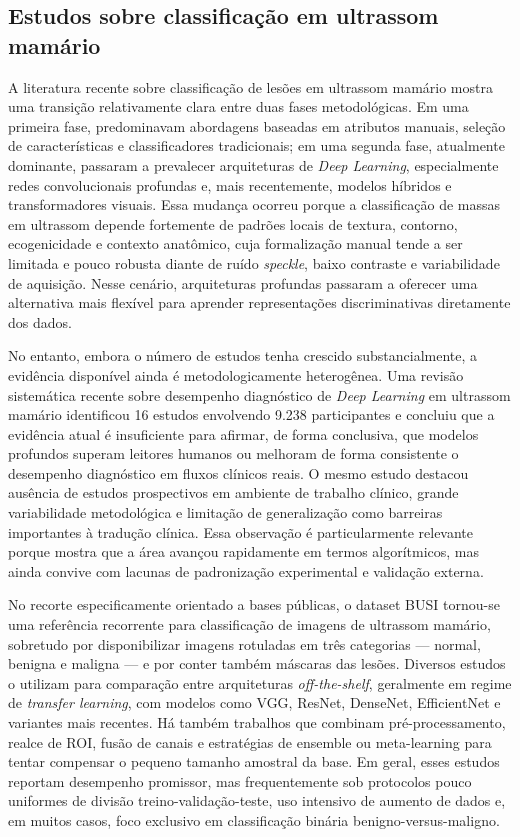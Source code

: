 \documentclass[tcc,capa]{texufpel}
\begin{document}
\subsection{Estudos sobre classificação em ultrassom mamário}

A literatura recente sobre classificação de lesões em ultrassom mamário mostra uma transição relativamente clara entre duas fases metodológicas. Em uma primeira fase, predominavam abordagens baseadas em atributos manuais, seleção de características e classificadores tradicionais; em uma segunda fase, atualmente dominante, passaram a prevalecer arquiteturas de \textit{Deep Learning}, especialmente redes convolucionais profundas e, mais recentemente, modelos híbridos e transformadores visuais. Essa mudança ocorreu porque a classificação de massas em ultrassom depende fortemente de padrões locais de textura, contorno, ecogenicidade e contexto anatômico, cuja formalização manual tende a ser limitada e pouco robusta diante de ruído \textit{speckle}, baixo contraste e variabilidade de aquisição. Nesse cenário, arquiteturas profundas passaram a oferecer uma alternativa mais flexível para aprender representações discriminativas diretamente dos dados. \cite{Dan2024,Alotaibi2023USClassification}

No entanto, embora o número de estudos tenha crescido substancialmente, a evidência disponível ainda é metodologicamente heterogênea. Uma revisão sistemática recente sobre desempenho diagnóstico de \textit{Deep Learning} em ultrassom mamário identificou 16 estudos envolvendo 9.238 participantes e concluiu que a evidência atual é insuficiente para afirmar, de forma conclusiva, que modelos profundos superam leitores humanos ou melhoram de forma consistente o desempenho diagnóstico em fluxos clínicos reais. O mesmo estudo destacou ausência de estudos prospectivos em ambiente de trabalho clínico, grande variabilidade metodológica e limitação de generalização como barreiras importantes à tradução clínica. Essa observação é particularmente relevante porque mostra que a área avançou rapidamente em termos algorítmicos, mas ainda convive com lacunas de padronização experimental e validação externa. \cite{Dan2024}

No recorte especificamente orientado a bases públicas, o dataset BUSI tornou-se uma referência recorrente para classificação de imagens de ultrassom mamário, sobretudo por disponibilizar imagens rotuladas em três categorias --- normal, benigna e maligna --- e por conter também máscaras das lesões. Diversos estudos o utilizam para comparação entre arquiteturas \textit{off-the-shelf}, geralmente em regime de \textit{transfer learning}, com modelos como VGG, ResNet, DenseNet, EfficientNet e variantes mais recentes. Há também trabalhos que combinam pré-processamento, realce de ROI, fusão de canais e estratégias de ensemble ou meta-learning para tentar compensar o pequeno tamanho amostral da base. Em geral, esses estudos reportam desempenho promissor, mas frequentemente sob protocolos pouco uniformes de divisão treino-validação-teste, uso intensivo de aumento de dados e, em muitos casos, foco exclusivo em classificação binária benigno-versus-maligno. \cite{AlDhabyani2020,Alotaibi2023USClassification,Ali2023MetaLearning}
\end{document}
